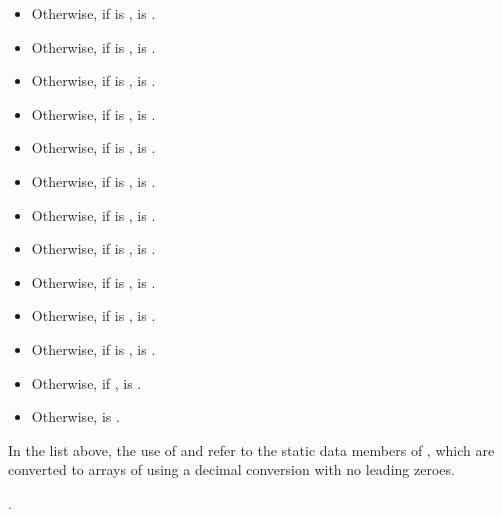 \begin{itemdescr}
\begin{itemize}
\item
Otherwise, if  is ,
 is .

\item
Otherwise, if  is ,
 is .

\item
Otherwise, if  is ,
 is .

\item
Otherwise, if  is ,
 is .

\item
Otherwise, if  is ,
 is .

\item
Otherwise, if  is ,
 is .

\item
Otherwise, if  is ,
 is .

\item
Otherwise, if  is ,
 is .

\item
Otherwise, if  is ,
 is .

\item
Otherwise, if  is ,
 is .

\item
Otherwise, if  is ,
 is .

\item
Otherwise, if ,
 is .

\item
Otherwise,  is
.
\end{itemize}

In the list above,
the use of  and 
refer to the static data members of ,
which are converted to arrays of  using a decimal conversion with no leading zeroes.

\pnum
\returns
{}.
\end{itemdescr}

